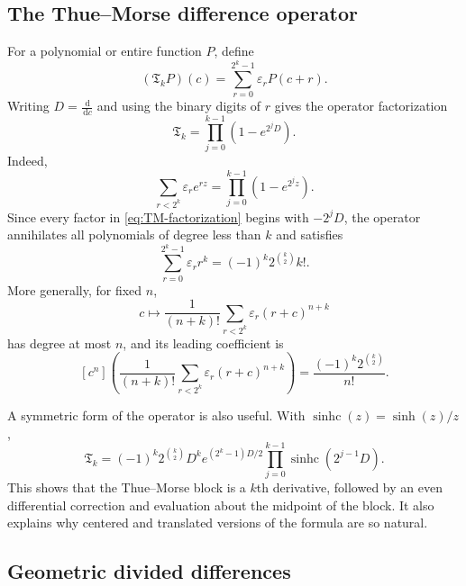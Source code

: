 \documentclass[11pt,oneside]{article}
\theoremstyle{definition}
\theoremstyle{remark}
\newcommand{\eps}{\varepsilon}
\newcommand{\dd}{\,\mathrm d}
\newcommand{\Toperator}{\mathfrak T}
\newcommand{\coeff}[2]{\left[#1^{#2}\right]}
\begin{document}
\subsection{The Thue--Morse difference operator}

For a polynomial or entire function $P$, define
\begin{equation}\label{eq:TM-operator}
  (\Toperator_kP)(c)
  =\sum_{r=0}^{2^k-1}\eps_rP(c+r).
\end{equation}
Writing $D=\frac{\dd}{\dd c}$ and using the binary digits of $r$ gives the
operator factorization
\begin{equation}\label{eq:TM-factorization}
  \Toperator_k
  =\prod_{j=0}^{k-1}\left(1-e^{2^jD}\right).
\end{equation}
Indeed,
\[
 \sum_{r<2^k}\eps_re^{rz}
 =\prod_{j=0}^{k-1}(1-e^{2^jz}).
\]
Since every factor in \eqref{eq:TM-factorization} begins with
$-2^jD$, the operator annihilates all polynomials of degree less than $k$ and
satisfies
\begin{equation}\label{eq:first-TM-moment}
  \sum_{r=0}^{2^k-1}\eps_rr^k
  =(-1)^k2^{\binom k2}k!.
\end{equation}
More generally, for fixed $n$,
\begin{equation}\label{eq:TM-degree-n}
  c\longmapsto
  \frac1{(n+k)!}
  \sum_{r<2^k}\eps_r(r+c)^{n+k}
\end{equation}
has degree at most $n$, and its leading coefficient is
\begin{equation}\label{eq:TM-leading-coeff}
  \coeff{c}{n}\left(
  \frac1{(n+k)!}\sum_{r<2^k}\eps_r(r+c)^{n+k}
  \right)
  =\frac{(-1)^k2^{\binom k2}}{n!}.
\end{equation}

A symmetric form of the operator is also useful.  With
$\operatorname{sinhc}(z)=\sinh(z)/z$,
\begin{equation}\label{eq:TM-sinhc}
 \Toperator_k
 =(-1)^k2^{\binom k2}D^k
 e^{(2^k-1)D/2}
 \prod_{j=0}^{k-1}
 \operatorname{sinhc}(2^{j-1}D).
\end{equation}
This shows that the Thue--Morse block is a $k$th derivative, followed by an
even differential correction and evaluation about the midpoint of the block.
It also explains why centered and translated versions of the formula are so
natural.

\subsection{Geometric divided differences}
\end{document}
